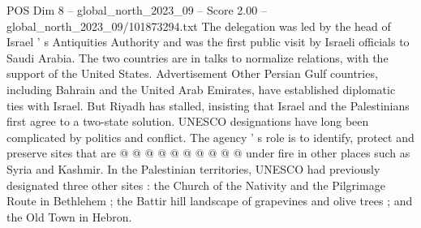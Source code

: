 \begin{textsample}{POS Dim 8 – global\_north\_2023\_09 – Score 2.00 – global\_north\_2023\_09/101873294.txt}
The delegation was led by the head of Israel ' s Antiquities Authority and was the first public visit by Israeli officials to Saudi Arabia.
The two countries are in talks to normalize relations, with the support of the United States.
Advertisement Other Persian Gulf countries, including Bahrain and the United Arab Emirates, have established diplomatic ties with Israel.
But Riyadh has stalled, insisting that Israel and the Palestinians first agree to a two-state solution.
UNESCO designations have long been complicated by politics and conflict.
The agency ' s role is to identify, protect and preserve sites that are @ @ @ @ @ @ @ @ @ @ under fire in other places such as Syria and Kashmir.
In the Palestinian territories, UNESCO had previously designated three other sites : the Church of the Nativity and the Pilgrimage Route in Bethlehem ; the Battir hill landscape of grapevines and olive trees ; and the Old Town in Hebron.

\end{textsample}

